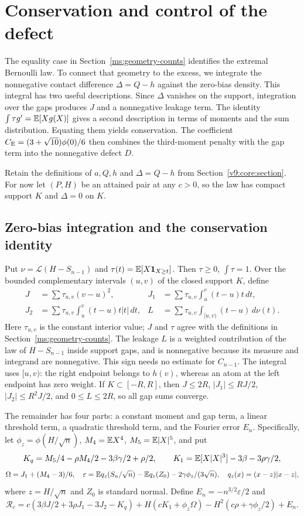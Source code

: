 \section{Conservation and control of the defect}\label{revision:conservation}
The equality case in Section~\ref{ms:geometry-counts} identifies the
extremal Bernoulli law. To connect that geometry to the excess, we
integrate the nonnegative contact difference $\Delta=Q-h$ against the
zero-bias density. This integral has two useful descriptions. Since
$\Delta$ vanishes on the support, integration over the gaps produces
$J$ and a nonnegative leakage term. The identity
$\int\tau g'=\mathbb E[Xg(X)]$ gives a second description in terms of
moments and the sum distribution. Equating them yields conservation.
The coefficient $C_{\mathrm E}=(3+\sqrt{10})\phi(0)/6$ then combines the
third-moment penalty with the gap term into the nonnegative defect $D$.

Retain the definitions of $a,Q,h$ and $\Delta=Q-h$ from
Section~\ref{v9:core:section}. For now let $(P,H)$ be an attained pair
at any $c>0$, so the law has compact support $K$ and $\Delta=0$ on $K$.

\subsection{Zero-bias integration and the conservation identity}

Put $\nu=\mathcal L(H-S_{n-1})$ and
$\tau(t)=\mathbb E[X\mathbf1_{X\ge t}]$. Then $\tau\ge0$, $\int\tau=1$.
Over the bounded complementary intervals $(u,v)$ of the closed support
$K$, define
\begin{align*}
 J&=\sum\tau_{u,v}(v-u)^2,&
 J_1&=\sum\tau_{u,v}\int_u^v(t-u)t\,dt,\\
 J_2&=\sum\tau_{u,v}\int_u^v(t-u)t|t|\,dt,&
 L&=\sum\tau_{u,v}\int_{[u,v)}(t-u)\,d\nu(t).
\end{align*}
Here $\tau_{u,v}$ is the constant interior value; $J$ and $\tau$ agree
with the definitions in Section~\ref{ms:geometry-counts}. The leakage
$L$ is a weighted contribution of the law of $H-S_{n-1}$ inside support
gaps, and is nonnegative because its measure and integrand are
nonnegative. This sign needs no estimate for $C_{n-1}$.
The integral uses $[u,v)$: the right endpoint belongs to
$h(v)$, whereas an atom at the left endpoint has zero weight. If
$K\subset[-R,R]$, then $J\le2R$, $|J_1|\le RJ/2$,
$|J_2|\le R^2J/2$, and $0\le L\le2R$, so all gap sums converge.

The remainder has four parts: a constant moment and gap term, a linear
threshold term, a quadratic threshold term, and the Fourier error $E_n$.
Specifically, let $\phi_z=\phi(H/\sqrt n)$,
$M_4=\mathbb E X^4$, $M_5=\mathbb E|X|^5$, and put
\[
 K_q=M_5/4-\rho M_4/2-3\beta\gamma/2+\rho/2,
 \qquad K_1=\mathbb E[X|X|^3]-3\beta-3\rho\gamma/2,
\]
\[
 \Omega=J_1+(M_4-3)/6,\quad
 \varepsilon=\mathbb E q_z(S_n/\sqrt n)-\mathbb E q_z(Z_0)
                  -2\gamma\phi_z/(3\sqrt n),\quad
 q_z(x)=(x-z)|x-z|,
\]
where $z=H/\sqrt n$ and $Z_0$ is standard normal. Define $E_n=-n^{3/2}\varepsilon/2$ and
\begin{equation}\label{v9:core:R}
 \mathcal R_c=c(3\beta J/2+3\rho J_1-3J_2-K_q)
 +H(cK_1+\phi_z\Omega)-H^2(c\rho+\gamma\phi_z/2)+E_n.
\end{equation}


